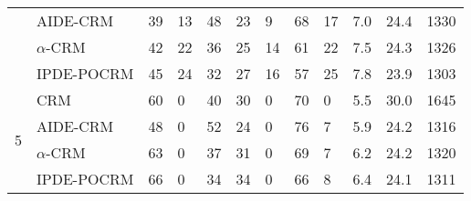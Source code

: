 \begin{tabular*}{\textwidth}{@{\extracolsep\fill}clllllllllll@{\extracolsep\fill}}
 & AIDE-CRM & 39 & 13 & 48 & 23 & 9 & 68 & 17 & 7.0 & 24.4 & 1330\\
 & $\alpha$-CRM & 42 & 22 & 36 & 25 & 14 & 61 & 22 & 7.5 & 24.3 & 1326\\
 & IPDE-POCRM & 45 & 24 & 32 & 27 & 16 & 57 & 25 & 7.8 & 23.9 & 1303\\
\midrule
\multirow{4}{2em}{5} & CRM & 60 & 0 & 40 & 30 & 0 & 70 & 0 & 5.5 & 30.0 & 1645\\
 & AIDE-CRM & 48 & 0 & 52 & 24 & 0 & 76 & 7 & 5.9 & 24.2 & 1316\\
 & $\alpha$-CRM & 63 & 0 & 37 & 31 & 0 & 69 & 7 & 6.2 & 24.2 & 1320\\
 & IPDE-POCRM & 66 & 0 & 34 & 34 & 0 & 66 & 8 & 6.4 & 24.1 & 1311\\
\bottomrule
\end{tabular*}
